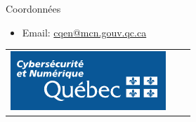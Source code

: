 \documentclass[final]{beamer}
\newlength{\onecolwid}
\begin{document}
\begin{frame}[t]
\begin{columns}[t]
\begin{column}{\onecolwid}

\begin{alertblock}{Coordonnées}

\begin{itemize}
\item Email: \href{mailto:cqen@mcn.gouv.qc.ca}{cqen@mcn.gouv.qc.ca}
\end{itemize}

\end{alertblock}

\vspace{15cm}

\begin{center}
\begin{tabular}{ccc}
\includegraphics[width=1.0\linewidth]{mcn.png}
\end{tabular}
\end{center}


\end{column} %

\end{columns} %

\end{frame} %
\end{document}
